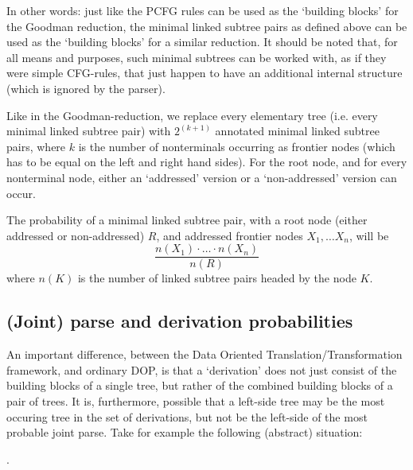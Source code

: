 \documentclass[a4paper]{article}
\theoremstyle{definition}
\begin{document}
In other words: just like the PCFG rules can be used as the `building blocks'
for the Goodman reduction, the minimal linked subtree pairs as defined above
can be used as the `building blocks' for a similar reduction. It should be
noted that, for all means and purposes, such minimal subtrees can be worked
with, as if they were simple CFG-rules, that just happen to have an additional
internal structure (which is ignored by the parser).

Like in the Goodman-reduction, we replace every elementary tree (i.e. every
minimal linked subtree pair) with $2^{(k+1)}$ annotated minimal linked subtree pairs,
where $k$ is the
number of nonterminals occurring as frontier nodes (which has to be equal on the
left and right hand sides). For the root node, and for every nonterminal node,
either an `addressed' version or a `non-addressed' version can occur.

The probability of a minimal linked subtree pair, with a root node (either addressed
or non-addressed) $R$, and addressed frontier nodes $X_1, \ldots X_n$, will be
\begin{displaymath}
\frac{n(X_1) \cdot \ldots \cdot n(X_n)}{n(R)}
\end{displaymath}
where $n(K)$ is the number of linked subtree pairs headed by the node $K$.

\subsection{(Joint) parse and derivation probabilities}

An important difference, between the Data Oriented Translation/Transformation framework, and ordinary DOP, is that a `derivation' does not just consist of the building blocks of a single tree, but rather of the combined building blocks of a pair of trees. It is, furthermore, possible that a left-side tree may be the most occuring tree in the set of derivations, but not be the left-side of the most probable joint parse. Take for example the following (abstract) situation:

\ex. \label{abstractexample}
\end{document}
